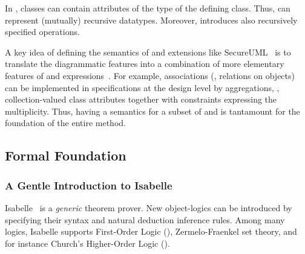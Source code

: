 In \UML, classes can contain attributes of the type of the
defining class.  Thus, \UML can represent (mutually) recursive
datatypes. Moreover, \OCL introduces also recursively specified
operations.

A key idea of defining the semantics of \UML and extensions like
SecureUML~\cite{brucker.ea:transformation:2006} is to translate the
diagrammatic \UML features into a combination of more elementary
features of \UML and \OCL
expressions~\cite{gogolla.ea:expressing:2001}. For example,
associations (\ie, relations on objects) can be implemented in
specifications at the design level by aggregations, \ie, collection-valued 
class attributes together with \OCL constraints expressing the
multiplicity. Thus, having a semantics for a subset of \UML and \OCL is
tantamount for the foundation of the entire method.
\endisatagafp



\subsection{Formal Foundation}

\subsubsection{A Gentle Introduction to Isabelle}
Isabelle~\cite{nipkow.ea:isabelle:2002} is a \emph{generic} theorem
prover. New object-logics can be introduced by specifying their syntax
and natural deduction inference rules. Among many logics, Isabelle
supports First-Order Logic (\FOL), Zermelo-Fraenkel set theory, and for
instance Church's Higher-Order Logic (\HOL).

